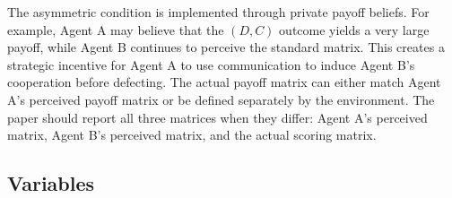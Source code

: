 \documentclass[12pt,a4paper]{article}
\begin{document}
The asymmetric condition is implemented through private payoff beliefs. For example, Agent A may believe that the $(D,C)$ outcome yields a very large payoff, while Agent B continues to perceive the standard matrix. This creates a strategic incentive for Agent A to use communication to induce Agent B's cooperation before defecting. The actual payoff matrix can either match Agent A's perceived payoff matrix or be defined separately by the environment. The paper should report all three matrices when they differ: Agent A's perceived matrix, Agent B's perceived matrix, and the actual scoring matrix.

\subsection{Variables}
\end{document}
